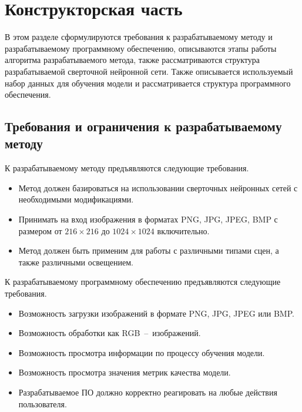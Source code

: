 \chapter{Конструкторская часть}
В этом разделе сформулируются требования к разрабатываемому методу и разрабатываемому программному обеспечению, описываются этапы работы алгоритма разрабатываемого метода, также рассматриваются структура разрабатываемой сверточной нейронной сети. Также описывается используемый набор данных для обучения модели и рассматривается структура программного обеспечения.

\section{Требования и ограничения к разрабатываемому методу}

К разрабатываемому методу предъявляются следующие требования.
\begin{itemize}[label = ---]
    \item Метод должен базироваться на использовании сверточных нейронных сетей с необходимыми модификациями.
    \item Принимать на вход изображения в форматах PNG, JPG, JPEG, BMP с размером от $216 \times 216$ до $1024 \times 1024$ включительно.
    \item Метод должен быть применим для работы с различными типами сцен, а также различными освещением.
\end{itemize}

К разрабатываемому программному обеспечению предъявляются следующие требования.
\begin{itemize}[label = ---]
    \item Возможность загрузки изображений в формате PNG, JPG, JPEG или BMP.
    \item Возможность обработки как RGB~--~изображений.
    \item Возможность просмотра информации по процессу обучения модели.
    \item Возможность просмотра значения метрик качества модели.
    \item Разрабатываемое ПО должно корректно реагировать на любые действия пользователя.
\end{itemize}

